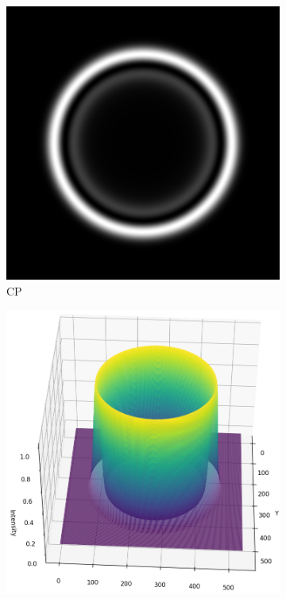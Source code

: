 \documentclass[11pt, a4paper, twoside]{article} %
\begin{document}
\begin{figure}[h!] 
     \centering 
    \begin{subfigure}[b]{0.24\linewidth}
    \includegraphics[width=\linewidth]{simul11.png}
    \caption{CP }
     \end{subfigure}
 \begin{subfigure}[b]{0.25\linewidth}
     \includegraphics[width=\linewidth]{simul12.png}

\end{subfigure}
\end{figure}
\end{document}
